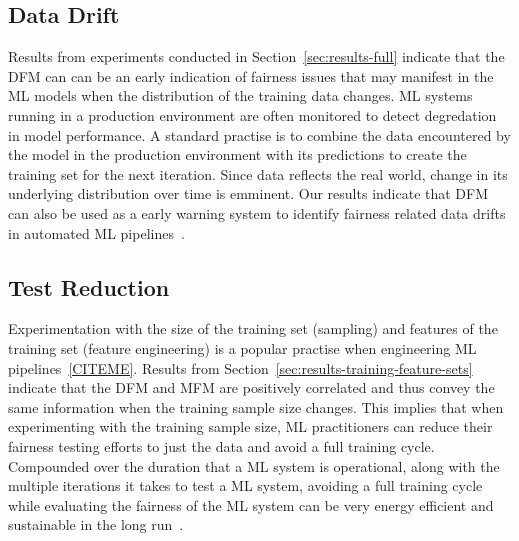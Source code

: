 \documentclass{article}
\begin{document}


\subsection{Data Drift}\label{sec:discuss-data-drift}

Results from experiments conducted in Section \ref{sec:results-full}
indicate that the DFM can can be an early indication of fairness
issues that may manifest in the ML models when the distribution of the
training data changes. ML systems running in a production environment
are often monitored to detect degredation in model performance. A
standard practise is to combine the data encountered by the model in
the production environment with its predictions to create the training
set for the next iteration. Since data reflects the real world, change
in its underlying distribution over time is emminent. Our results
indicate that DFM can also be used as a early warning system to
identify fairness related data drifts in automated ML
pipelines \cite{CITEME}.

\subsection{Test Reduction}\label{sec:discuss-test-red}

Experimentation with the size of the training set (sampling) and
features of the training set (feature engineering) is a popular
practise when engineering ML pipelines \ref{CITEME}. Results from
Section \ref{sec:results-training-feature-sets} indicate that the DFM
and MFM are positively correlated and thus convey the same information
when the training sample size changes. This implies that when
experimenting with the training sample size, ML practitioners can
reduce their fairness testing efforts to just the data and avoid a
full training cycle. Compounded over the duration that a ML system is
operational, along with the multiple iterations it takes to test a ML
system, avoiding a full training cycle while evaluating the fairness
of the ML system can be very energy efficient and sustainable in the
long run \cite{CITME}.

\end{document}
